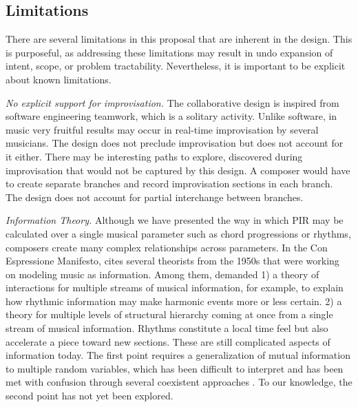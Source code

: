 \documentclass[final,authoryear,5p,times,twocolumn]{elsarticle}
\begin{document}
\subsection{Limitations}

There are several limitations in this proposal that are inherent in the design. This is purposeful, as addressing these limitations may result in undo expansion of intent, scope, or problem tractability. Nevertheless, it is important to be explicit about known limitations.

\textit{No explicit support for improvisation.} The collaborative design is inspired from software engineering teamwork, which is a solitary activity. Unlike software, in music very fruitful results may occur in real-time improvisation by several musicians. The design does not preclude improvisation but does not account for it either. There may be interesting paths to explore, discovered during improvisation that would not be captured by this design. A composer would have to create separate branches and record improvisation sections in each branch. The design does not account for partial interchange between branches.

\textit{Information Theory.} Although we have presented the way in which PIR may be calculated over a single musical parameter such as chord progressions or rhythms, composers create many complex relationships across parameters. In the Con Espressione Manifesto, \cite{widmer2016getting} cites several theorists from the 1950s that were working on modeling music as information. Among them, \cite {cohen1962information} demanded 1) a theory of interactions for multiple streams of musical information, for example, to explain how rhythmic information may make harmonic events more or less certain. 2) a theory for multiple levels of structural hierarchy coming at once from a single stream of musical information. Rhythms constitute a local time feel but also accelerate a piece toward new sections. These are still complicated aspects of information today. The first point requires a generalization of mutual information to multiple random variables, which has been difficult to interpret and has been met with confusion through several coexistent approaches \citep{van2011two}. To our knowledge, the second point has not yet been explored.
\end{document}
